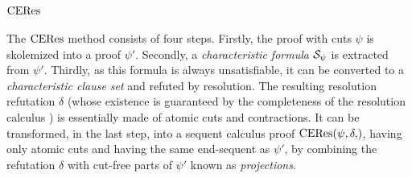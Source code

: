 \documentclass{llncs}
\begin{document}
\cite{BaazLeitsch2009MethodsofCut-Elimination}


\section{$\mathrm{CERes}$}


The $\mathrm{CERes}$ method consists of four steps. Firstly, the proof with cuts $\psi$ is skolemized into a proof $\psi'$. Secondly, a \emph{characteristic formula} $\mathcal{S}_{\psi}$ is extracted from $\psi'$. Thirdly, as this formula is always unsatisfiable, it can be converted to a \emph{characteristic clause set} and refuted by resolution. The resulting resolution refutation $\delta$ (whose existence is guaranteed by the completeness of the resolution calculus \cite{ToDo}) is essentially made of atomic cuts and contractions. It can be transformed, in the last step, into a sequent calculus proof $\CEResNF{\psi,\delta}$, having only atomic cuts and having the same end-sequent as $\psi'$, by combining the refutation $\delta$ with cut-free parts of $\psi'$ known as \emph{projections}.


\end{document}
